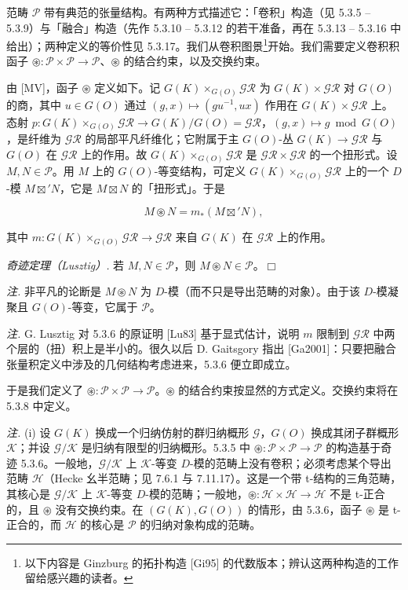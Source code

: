  范畴 $\mathcal{P}$ 带有典范的张量结构。有两种方式描述它：「卷积」构造（见 5.3.5 -- 5.3.9）与「融合」构造（先作 5.3.10 -- 5.3.12 的若干准备，再在 5.3.13 -- 5.3.16 中给出）；两种定义的等价性见 5.3.17。我们从卷积图景\footnote{以下内容是 Ginzburg 的拓扑构造 [Gi95] 的代数版本；辨认这两种构造的工作留给感兴趣的读者。}开始。我们需要定义卷积积函子 $\circledast:\mathcal{P}\times\mathcal{P}\to\mathcal{P}$、$\circledast$ 的结合约束，以及交换约束。

由 [MV]，函子 $\circledast$ 定义如下。记 $G(K)\times_{G(O)}\mathcal{GR}$ 为 $G(K)\times\mathcal{GR}$ 对 $G(O)$ 的商，其中 $u\in G(O)$ 通过 $(g,x)\mapsto(gu^{-1},ux)$ 作用在 $G(K)\times\mathcal{GR}$ 上。态射 $p:G(K)\times_{G(O)}\mathcal{GR}\to G(K)/G(O)=\mathcal{GR}$，$(g,x)\mapsto g\bmod G(O)$，是纤维为 $\mathcal{GR}$ 的局部平凡纤维化；它附属于主 $G(O)$-丛 $G(K)\to\mathcal{GR}$ 与 $G(O)$ 在 $\mathcal{GR}$ 上的作用。故 $G(K)\times_{G(O)}\mathcal{GR}$ 是 $\mathcal{GR}\times\mathcal{GR}$ 的一个扭形式。设 $M,N\in\mathcal{P}$。用 $M$ 上的 $G(O)$-等变结构，可定义 $G(K)\times_{G(O)}\mathcal{GR}$ 上的一个 $D$-模 $M\boxtimes'N$，它是 $M\boxtimes N$ 的「扭形式」。于是

\begin{equation}\tag{260}
M\circledast N=m_{*}(M\boxtimes'N),
\end{equation}

其中 $m:G(K)\times_{G(O)}\mathcal{GR}\to\mathcal{GR}$ 来自 $G(K)$ 在 $\mathcal{GR}$ 上的作用。

 \emph{奇迹定理（Lusztig）.} 若 $M,N\in\mathcal{P}$，则 $M\circledast N\in\mathcal{P}$。\hfill$\Box$


\emph{注.} 非平凡的论断是 $M\circledast N$ 为 $D$-模（而不只是导出范畴的对象）。由于该 $D$-模凝聚且 $G(O)$-等变，它属于 $\mathcal{P}$。

\emph{注.} G. Lusztig 对 5.3.6 的原证明 [Lu83] 基于显式估计，说明 $m$ 限制到 $\mathcal{GR}$ 中两个层的（扭）积上是半小的。很久以后 D. Gaitsgory 指出 [Ga2001]：只要把融合张量积定义中涉及的几何结构考虑进来，5.3.6 便立即成立。

于是我们定义了 $\circledast:\mathcal{P}\times\mathcal{P}\to\mathcal{P}$。$\circledast$ 的结合约束按显然的方式定义。交换约束将在 5.3.8 中定义。

 \emph{注.} (i) 设 $G(K)$ 换成一个归纳仿射的群归纳概形 $\mathcal{G}$，$G(O)$ 换成其闭子群概形 $\mathcal{K}$；并设 $\mathcal{G}/\mathcal{K}$ 是归纳有限型的归纳概形。5.3.5 中 $\circledast:\mathcal{P}\times\mathcal{P}\to\mathcal{P}$ 的构造基于奇迹 5.3.6。一般地，$\mathcal{G}/\mathcal{K}$ 上 $\mathcal{K}$-等变 $D$-模的范畴上没有卷积；必须考虑某个导出范畴 $\mathcal{H}$（Hecke 幺半范畴；见 7.6.1 与 7.11.17）。这是一个带 t-结构的三角范畴，其核心是 $\mathcal{G}/\mathcal{K}$ 上 $\mathcal{K}$-等变 $D$-模的范畴；一般地，$\circledast:\mathcal{H}\times\mathcal{H}\to\mathcal{H}$ 不是 t-正合的，且 $\circledast$ 没有交换约束。在 $(G(K),G(O))$ 的情形，由 5.3.6，函子 $\circledast$ 是 t-正合的，而 $\mathcal{H}$ 的核心是 $\mathcal{P}$ 的归纳对象构成的范畴。

